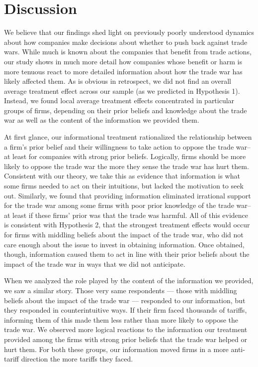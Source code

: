 \documentclass{article}
\begin{document}
\section{Discussion}

We believe that our findings shed light on previously poorly understood dynamics about how companies make decisions about whether to push back against trade wars. While much is known about the companies that benefit from trade actions, our study shows in much more detail how companies whose benefit or harm is more tenuous react to more detailed information about how the trade war has likely affected them. As is obvious in retrospect, we did not find an overall average treatment effect across our sample (as we predicted in Hypothesis 1). Instead, we found local average treatment effects concentrated in particular groups of firms, depending on their prior beliefs and knowledge about the trade war as well as the content of the information we provided them.

At first glance, our informational treatment rationalized the relationship between a firm's prior belief and their willingness to take action to oppose the trade war--at least for companies with strong prior beliefs. Logically, firms should be more likely to oppose the trade war the more they sense the trade war has hurt them. Consistent with our theory, we take this as evidence that information is what some firms needed to act on their intuitions, but lacked the motivation to seek out. Similarly, we found that providing information eliminated irrational support for the trade war among some firms with poor prior knowledge of the trade war--at least if these firms' prior was that the trade was harmful. All of this evidence is consistent with Hypothesis 2, that the strongest treatment effects would occur for firms with middling beliefs about the impact of the trade war, who did not care enough about the issue to invest in obtaining information. Once obtained, though, information caused them to act in line with their prior beliefs about the impact of the trade war in ways that we did not anticipate.

When we analyzed the role played by the content of the information we provided, we saw a similar story. Those very same respondents --- those with middling beliefs about the impact of the trade war --- responded to our information, but they responded in counterintuitive ways. If their firm faced thousands of tariffs, informing them of this made them less rather than more likely to oppose the trade war. We observed more logical reactions to the information our treatment provided among the firms with strong prior beliefs that the trade war helped or hurt them. For both these groups, our information moved firms in a more anti-tariff direction the more tariffs they faced.
\end{document}
